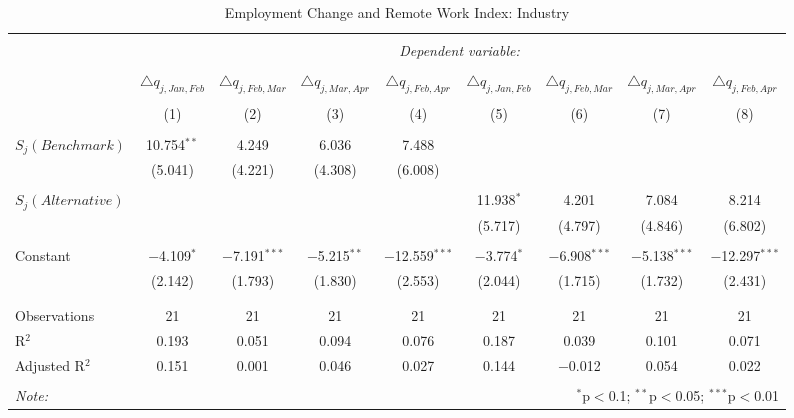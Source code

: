 
\begin{table}[!htbp] \centering 
  \caption{Employment Change and Remote Work Index: Industry} 
  \label{tab:regression_dynamics_industry} 
\footnotesize 
\begin{tabular}{@{\extracolsep{5pt}}lcccccccc} 
\\[-1.8ex]\hline 
\hline \\[-1.8ex] 
 & \multicolumn{8}{c}{\textit{Dependent variable:}} \\ 
\cline{2-9} 
\\[-1.8ex] & $\triangle q_{j,Jan,Feb}$ & $\triangle q_{j,Feb,Mar}$ & $\triangle q_{j,Mar,Apr}$ & $\triangle q_{j,Feb,Apr}$ & $\triangle q_{j,Jan,Feb}$ & $\triangle q_{j,Feb,Mar}$ & $\triangle q_{j,Mar,Apr}$ & $\triangle q_{j,Feb,Apr}$ \\ 
\\[-1.8ex] & (1) & (2) & (3) & (4) & (5) & (6) & (7) & (8)\\ 
\hline \\[-1.8ex] 
 $S_{j}(Benchmark)$ & 10.754$^{**}$ & 4.249 & 6.036 & 7.488 &  &  &  &  \\ 
  & (5.041) & (4.221) & (4.308) & (6.008) &  &  &  &  \\ 
  & & & & & & & & \\ 
 $S_{j}(Alternative)$ &  &  &  &  & 11.938$^{*}$ & 4.201 & 7.084 & 8.214 \\ 
  &  &  &  &  & (5.717) & (4.797) & (4.846) & (6.802) \\ 
  & & & & & & & & \\ 
 Constant & $-$4.109$^{*}$ & $-$7.191$^{***}$ & $-$5.215$^{**}$ & $-$12.559$^{***}$ & $-$3.774$^{*}$ & $-$6.908$^{***}$ & $-$5.138$^{***}$ & $-$12.297$^{***}$ \\ 
  & (2.142) & (1.793) & (1.830) & (2.553) & (2.044) & (1.715) & (1.732) & (2.431) \\ 
  & & & & & & & & \\ 
\hline \\[-1.8ex] 
Observations & 21 & 21 & 21 & 21 & 21 & 21 & 21 & 21 \\ 
R$^{2}$ & 0.193 & 0.051 & 0.094 & 0.076 & 0.187 & 0.039 & 0.101 & 0.071 \\ 
Adjusted R$^{2}$ & 0.151 & 0.001 & 0.046 & 0.027 & 0.144 & $-$0.012 & 0.054 & 0.022 \\ 
\hline 
\hline \\[-1.8ex] 
\textit{Note:}  & \multicolumn{8}{r}{$^{*}$p$<$0.1; $^{**}$p$<$0.05; $^{***}$p$<$0.01} \\ 
\end{tabular} 
\end{table} 
